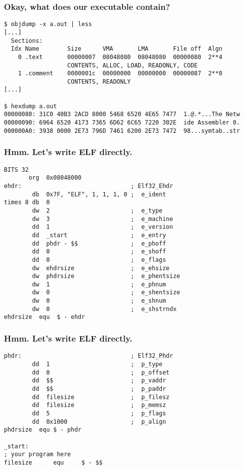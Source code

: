 \documentclass{beamer}
\begin{document}
\begin{frame}[fragile]
\frametitle{Okay, what does our executable contain?}
\begin{lstlisting}[basicstyle=\scriptsize\ttfamily]
$ objdump -x a.out | less
[...]
  Sections:
  Idx Name        Size      VMA       LMA       File off  Algn
    0 .text       00000007  08048080  08048080  00000080  2**4
                  CONTENTS, ALLOC, LOAD, READONLY, CODE
    1 .comment    0000001c  00000000  00000000  00000087  2**0
                  CONTENTS, READONLY
[...]

$ hexdump a.out
00000080: 31C0 40B3 2ACD 8000 5468 6520 4E65 7477  1.@.*...The Netw
00000090: 6964 6520 4173 7365 6D62 6C65 7220 302E  ide Assembler 0.
000000A0: 3938 0000 2E73 796D 7461 6200 2E73 7472  98...symtab..str
\end{lstlisting}
\end{frame}

\begin{frame}[fragile]
\frametitle{Hmm. Let's write ELF directly.}
\begin{lstlisting}[basicstyle=\scriptsize\ttfamily]
BITS 32
       org  0x08048000
ehdr:                               ; Elf32_Ehdr
        db  0x7F, "ELF", 1, 1, 1, 0 ;  e_ident
times 8 db  0
        dw  2                       ;  e_type
        dw  3                       ;  e_machine
        dd  1                       ;  e_version
        dd  _start                  ;  e_entry
        dd  phdr - $$               ;  e_phoff
        dd  0                       ;  e_shoff
        dd  0                       ;  e_flags
        dw  ehdrsize                ;  e_ehsize
        dw  phdrsize                ;  e_phentsize
        dw  1                       ;  e_phnum
        dw  0                       ;  e_shentsize
        dw  0                       ;  e_shnum
        dw  0                       ;  e_shstrndx
ehdrsize  equ  $ - ehdr
\end{lstlisting}
\end{frame}

\begin{frame}[fragile]
\frametitle{Hmm. Let's write ELF directly.}
\begin{lstlisting}[basicstyle=\scriptsize\ttfamily]
phdr:                               ; Elf32_Phdr
        dd  1                       ;  p_type
        dd  0                       ;  p_offset
        dd  $$                      ;  p_vaddr
        dd  $$                      ;  p_paddr
        dd  filesize                ;  p_filesz
        dd  filesize                ;  p_memsz
        dd  5                       ;  p_flags
        dd  0x1000                  ;  p_align
phdrsize  equ $ - phdr

_start:
; your program here
filesize      equ     $ - $$
\end{lstlisting}
\end{frame}
\end{document}
